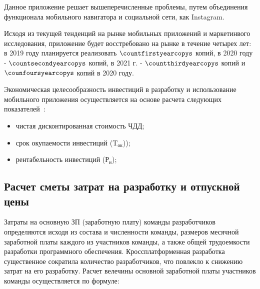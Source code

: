 Данное приложение решает вышеперечисленные проблемы, путем объединения функционала мобильного навигатора и социальной сети, как Instagram.

Исходя из текущей тенденций на рынке мобильных приложений и маркетинвого исследования, приложение будет восстребовано на рынке в течение четырех лет:
в 2019 году планируется реализовать $ \countfirstyearcopys $ копий, в 2020 году - $ \countsecondyearcopys $ копий, в 2021 г. - $ \countthirdyearcopys $ копий и $ \counfoursyearcopys $ копий в 2020 году.

Экономическая целесообразность инвестиций в разработку и использование мобильного приложения осуществляется на основе расчета следующих показателей~\cite{nosenko}:
\begin{itemize}
	\item чистая дисконтированная стоимость ЧДД;
	\item срок окупаемости инвестиций ($ \text{T}_\text{ок} $));
	\item рентабельность инвестиций ($ \text{Р}_\text{н} $);
\end{itemize}

\subsection{Расчет сметы затрат на разработку и отпускной цены}
\label{sec:economics:estimate}

Затраты на основную ЗП (заработную плату) команды разработчиков определяются исходя из состава и численности команды, размеров месячной заработной платы каждого из участников команды, а также общей трудоемкости разработки программного обеспечения. Кроссплатформенная разработка существенное сократила количество разработчиков, что повлекло к снижению затрат на его разработку. Расчет велечины основной заработной платы участников команды осуществляется по формуле:

